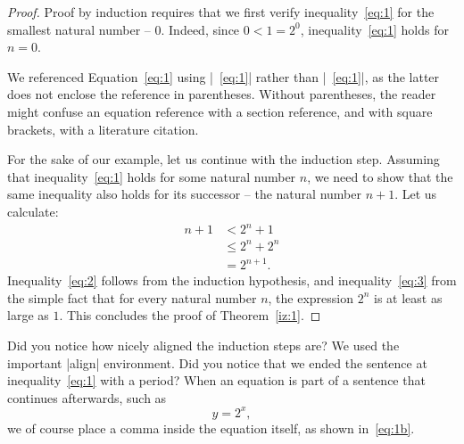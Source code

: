 \documentclass[9pt]{style/friteza}
\begin{document}
\begin{proof}
  Proof by induction requires that we first verify inequality~\eqref{eq:1} for the smallest natural number -- $0$.
  Indeed, since $0 < 1 = 2^0$, inequality~\eqref{eq:1} holds for $n=0$.

  We referenced Equation~\eqref{eq:1} using \ltx|~\eqref{eq:1}| rather than \ltx|~\ref{eq:1}|, as the latter does not enclose the reference in parentheses. Without parentheses, the reader might confuse an equation reference with a section reference, and with square brackets, with a literature citation.
  
  For the sake of our example, let us continue with the induction step. Assuming that inequality~\eqref{eq:1} holds for some natural number $n$, we need to show that the same inequality also holds for its successor -- the natural number $n+1$.
  Let us calculate:
  \begin{align}
    n+1 & < 2^n + 1       \label{eq:2}\\
    & \le 2^n + 2^n \label{eq:3}\\
    & = 2^{n+1}.       \nonumber
  \end{align}
  Inequality~\eqref{eq:2} follows from the induction hypothesis, and inequality~\eqref{eq:3} from the simple fact that for every natural number $n$, the expression $2^n$ is at least as large as $1$.
  This concludes the proof of Theorem~\ref{iz:1}.
\end{proof}

Did you notice how nicely aligned the induction steps are? We used the important \ltx|align| environment. Did you notice that we ended the sentence at inequality~\eqref{eq:1} with a period? When an equation is part of a sentence that continues afterwards, such as
 \begin{equation}
    y = 2^x,
    \label{eq:1b}
  \end{equation}
we of course place a comma inside the equation itself, as shown in~\eqref{eq:1b}. 

\end{document}
